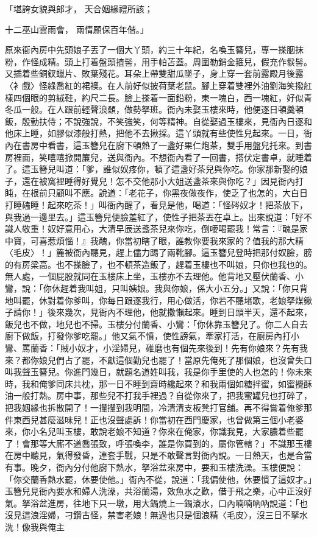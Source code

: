 「堪誇女貌與郎才，  天合姻緣禮所該；

十二巫山雲雨會，  兩情願保百年偕。」

原來衙內房中先頭娘子丟了一個大丫頭，約三十年紀，名喚玉簪兒，專一搽胭抹粉，作怪成精。頭上打着盤頭揸髻，用手帕苫蓋。周圍勒銷金箍兒，假充作䯼髻。又插着些銅釵蠟片、敗葉殘花。耳朵上帶雙甜瓜墜子，身上穿一套前露殿月後露〈衤戲〉怪綠喬紅的裙襖。在人前好似披荷葉老鼠。腳上穿着雙裡外油劉海笑撥舡樣四個眼的剪絨鞋，約尺二長。臉上搽着一面鉛粉，東一塊白，西一塊紅，好似青冬瓜一般。在人跟前輕聲浪顙，做勢拏班。衙內未娶玉樓來時，他便逐日頓羹頓飯，殷勤扶侍；不說強說，不笑強笑，何等精神。自從娶過玉樓來，見衙內日逐和他床上睡，如膠似漆般打熱，把他不去揪採。這丫頭就有些使性兒起來。一日，衙內在書房中看書，這玉簪兒在廚下頓熱了一盞好果仁炮茶，雙手用盤兒托來。到書房裡面，笑嘻嘻掀開簾兒，送與衙內。不想衙內看了一回書，搭伏定書卓，就睡着了。這玉簪兒叫道：「爹，誰似奴疼你，頓了這盞好茶兒與你吃。你家那新娶的娘子，還在被窩裡睡得好覺兒！怎不交他那小大姐送盞茶來與你吃？」因見衙內打盹，在根前只顧叫不應。說道：「老花子，你黑夜做夜作，使乏了也怎的，大白日打睡磕睡！起來吃茶！」叫衙內醒了，看見是他，喝道：「怪硶奴才！把茶放下，與我過一邊里去。」這玉簪兒便臉羞紅了，使性子把茶丟在卓上。出來說道：「好不識人敬重！奴好意用心，大清早辰送盞茶兒來你吃，倒喓喝罷我！常言：『醜是家中寶，可喜惹煩惱！』我醜，你當初瞎了眼，誰教你要我來家的？值我的那大精〈毛皮〉！」簏被衙內聽見，趕上儘力踢了兩靴腳。這玉簪兒登時把那付奴臉，膀的有房梁高。也不搽臉了，也不頓茶造飯了，趕着玉樓也不叫娘，只你也我也的。無人處，一個屁股就同在玉樓床上坐，玉樓亦不去理他。他背地又壓伏蘭香、小鸞，說：「你休趕着我叫姐，只叫姨娘。我與你娘，係大小五分。」又說：「你只背地叫罷，休對着你爹叫，你每日跟逐我行，用心做活，你若不聽堵歌，老娘拏煤鍬子請你！」後來幾次，見衙內不理他，他就撒懶起來。睡到日頭半天，還不起來，飯兒也不做，地兒也不掃。玉樓分付蘭香、小鸞：「你休靠玉簪兒了。你二人自去廚下做飯，打發你爹吃罷。」他又氣不憤，使性謗氣，牽家打活，在廚房內打小鸞、罵蘭香：「賊小奴才，小淫婦兒，碓磨也有個先來後到！先有你娘來？先有我來？都你娘兒們占了罷，不獻這個勤兒也罷了！當原先俺死了那個娘，也沒曾失口叫我聲玉簪兒。你進門幾日，就題名道姓叫我，我是你手里使的人也怎的！你未來時，我和俺爹同床共枕，那一日不睡到齋時纔起來？和我兩個如糖拌蜜，如蜜攪酥油一般打熱。房中事，那些兒不打我手裡過？自從你來了，把我蜜罐兒也打碎了，把我姻緣也拆散開了！一攆攆到我明間，冷清清支板凳打官舖。再不得嘗着俺爹那件東西兒甚麼滋味兒！正也沒聲處訴！你當初在西門慶家，也曾做第三個小老婆來，你小名兒叫玉樓，敢說老娘不知道？你來在俺家，你識我見，大家膿着些罷了！會那等大廝不道喬張致，呼張喚李，誰是你買到的，屬你管轄？」不識那玉樓在房中聽見，氣得發昏，連套手戰，只是不敢聲言對衙內說。一日熱天，也是合當有事。晚夕，衙內分付他廚下熱水，拏浴盆來房中，要和玉樓洗澡。玉樓便說：「你交蘭香熱水罷，休要使他。」衙內不從，說道：「我偏使他，休要慣了這奴才。」玉簪兒見衙內要水和婦人洗澡，共浴蘭湯，效魚水之歡，借于飛之樂，心中正沒好氣。拏浴盆進房，往地下只一墩，用大鍋燒上一鍋滾水，口內喃喃吶吶說道：「也沒見這浪淫婦，刁鑽古怪，禁害老娘！無過也只是個浪精〈毛皮〉，沒三日不拏水洗！像我與俺主